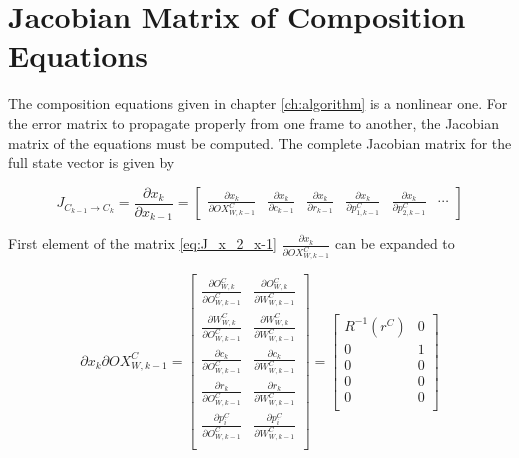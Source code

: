 \chapter{Jacobian Matrix of Composition Equations}\label{ch:appendix4}

The composition equations given in chapter \ref{ch:algorithm} is a
nonlinear one. For the error matrix to propagate properly from one
frame to another, the Jacobian matrix of the equations must be
computed. The complete Jacobian matrix for the full state vector is
given by 

\begin{equation}
\label{eq:J_x_2_x-1}
 J_{C_{k-1} \to C_k} = \frac{\partial x_{k}}{\partial x_{k-1}}=
\begin{bmatrix} 
\frac{\partial x_{k}}{\partial OX_{W, k-1}^{C}} &
\frac{\partial x_{k}}{\partial c_{k-1}} & 
\frac{\partial x_{k}}{\partial r_{k-1}} & 
\frac{\partial x_{k}}{\partial p_{1, k-1}^{C}} &
\frac{\partial x_{k}}{\partial p_{2, k-1}^{C}} &
\cdots 
\end{bmatrix}
\end{equation}


First element of the matrix \ref{eq:J_x_2_x-1} $\frac{\partial
  x_{k}}{\partial OX_{W, k-1}^{C}}$ can be expanded to

$$
{\partial x_{k}}{\partial OX_{W, k-1}^{C}}=\begin{bmatrix}
\frac{\partial O_{W,k}^{C}}{\partial O_{W,k-1}^{C}} & 
\frac{\partial O_{W,k}^{C}}{\partial W_{W,k-1}^{C}} \\
\frac{\partial W_{W,k}^{C}}{\partial O_{W,k-1}^{C}} & 
\frac{\partial W_{W,k}^{C}}{\partial W_{W,k-1}^{C}} \\
\frac{\partial c_{k}}{\partial O_{W,k-1}^{C}} & 
\frac{\partial c_{k}}{\partial W_{W,k-1}^{C}} \\
\frac{\partial r_{k}}{\partial O_{W,k-1}^{C}} & 
\frac{\partial r_{k}}{\partial W_{W,k-1}^{C}} \\
\frac{\partial p_{i}^{C}}{\partial O_{W,k-1}^{C}} & 
\frac{\partial p_{i}^{C}}{\partial W_{W,k-1}^{C}} \\
\end{bmatrix} = \begin{bmatrix}
R^{-1}(r^{C}) & 0 \\
0 & 1 \\
0 & 0 \\
0 & 0 \\
0 & 0 \\
\end{bmatrix}
$$

